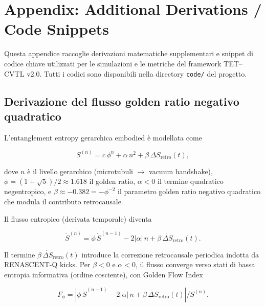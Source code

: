 \documentclass[11pt,a4paper]{article}
\theoremstyle{plain}
\theoremstyle{definition}
\begin{document}
\appendix
\section{Appendix: Additional Derivations / Code Snippets}
\label{app:derivations-code}

Questa appendice raccoglie derivazioni matematiche supplementari e snippet di codice chiave utilizzati per le simulazioni e le metriche del framework TET–CVTL v2.0. Tutti i codici sono disponibili nella directory \texttt{code/} del progetto.

\subsection{Derivazione del flusso golden ratio negativo quadratico}
\label{subsec:app-golden-flow}

L'entanglement entropy gerarchica embodied è modellata come

\begin{equation}
    S^{(n)} = c \, \phi^n + \alpha \, n^2 + \beta \, \Delta S_{\text{retro}}(t),
    \label{eq:app-entropy-full}
\end{equation}

\vspace{0.2cm}

dove $n$ è il livello gerarchico (microtubuli $\to$ vacuum handshake), $\phi = (1+\sqrt{5})/2 \approx 1.618$ il golden ratio, $\alpha < 0$ il termine quadratico negentropico, e $\beta \approx -0.382 = -\phi^{-2}$ il parametro golden ratio negativo quadratico che modula il contributo retrocausale.

Il flusso entropico (derivata temporale) diventa

\begin{equation}
    \dot{S}^{(n)} = \phi \, \dot{S}^{(n-1)} - 2|\alpha| \, n + \beta \, \dot{\Delta S}_{\text{retro}}(t).
    \label{eq:app-flow-derivation}
\end{equation}

Il termine $\beta \, \dot{\Delta S}_{\text{retro}}(t)$ introduce la correzione retrocausale periodica indotta da RENASCENT-Q kicks. Per $\beta < 0$ e $\alpha < 0$, il flusso converge verso stati di bassa entropia informativa (ordine cosciente), con Golden Flow Index

\begin{equation}
    F_{\phi} = \left| \phi \, \dot{S}^{(n-1)} - 2|\alpha| \, n + \beta \, \dot{\Delta S}_{\text{retro}}(t) \right| / S^{(n)}.
    \label{eq:app-fphi}
\end{equation}
\end{document}
